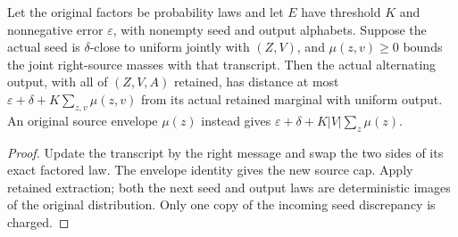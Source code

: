 \begin{theorem}
  \label{thm:lowerbounds-algebraic-alternating-extraction}
  \leanok
  Let the original factors be probability laws and let $E$ have threshold
  $K$ and nonnegative error $\varepsilon$, with nonempty seed and output
  alphabets. Suppose the actual seed is $\delta$-close to uniform jointly
  with $(Z,V)$, and $\mu(z,v)\ge0$ bounds the joint right-source masses
  with that transcript. Then the actual alternating output, with all of
  $(Z,V,A)$ retained, has distance at most
  $\varepsilon+\delta+K\sum_{z,v}\mu(z,v)$ from its actual retained
  marginal with uniform output. An original source envelope $\mu(z)$
  instead gives $\varepsilon+\delta+K|V|\sum_z\mu(z)$.
\end{theorem}
\begin{proof}
  \leanok
  Update the transcript by the right message and swap the two sides of
  its exact factored law. The envelope identity gives the new source cap.
  Apply retained extraction; both the next seed and output laws are
  deterministic images of the original distribution. Only one copy of
  the incoming seed discrepancy is charged.
\end{proof}

